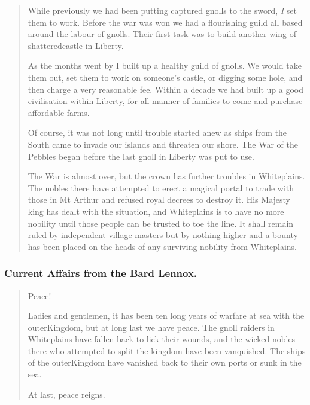 \begin{multicols}{2}
\begin{quotation}
  While previously we had been putting captured gnolls to the sword, \emph{I} set them to work.
  Before the war was won we had a flourishing guild all based around the labour of gnolls.
  Their first task was to build another wing of \gls{shatteredcastle} in Liberty.

  As the months went by I built up a healthy guild of gnolls.
  We would take them out, set them to work on someone's castle, or digging some hole, and then charge a very reasonable fee.
  Within a decade we had built up a good civilisation within Liberty, for all manner of families to come and purchase affordable farms.

  Of course, it was not long until trouble started anew as ships from the South came to invade our islands and threaten our shore.
  The War of the Pebbles began before the last gnoll in Liberty was put to use.

  \label{whiteplainsWar}
  The War is almost over, but the crown has further troubles in Whiteplains.
  The nobles there have attempted to erect a magical portal to trade with those in Mt Arthur and refused royal decrees to destroy it.
  His Majesty \gls{king} has dealt with the situation, and Whiteplains is to have no more nobility until those people can be trusted to toe the line.
  It shall remain ruled by independent village masters but by nothing higher and a bounty has been placed on the heads of any surviving nobility from Whiteplains.

\end{quotation}

\subsubsection{Current Affairs from the Bard Lennox.}

\begin{quotation}

  Peace!

  Ladies and gentlemen, it has been ten long years of warfare at sea with the \gls{outerKingdom}, but at long last we have peace.
  The gnoll raiders in Whiteplains have fallen back to lick their wounds, and the wicked nobles there who attempted to split the kingdom have been vanquished.
  The ships of the \gls{outerKingdom} have vanished back to their own ports or sunk in the sea.

  At last, peace reigns.

\end{quotation}

\end{multicols}
